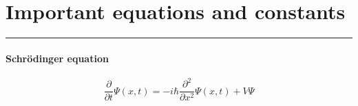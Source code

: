 \section*{Important equations and constants}
\vspace{-15pt}\noindent\rule{\textwidth}{0.1pt}\vspace{-10pt}
    \paragraph{Schrödinger equation}
    \begin{equation*}
        \dfrac{\partial}{\partial t}\Psi(x,t)=-i\hbar\frac{\partial^2}{\partial x ^2}\Psi(x,t)+V\Psi
    \end{equation*}